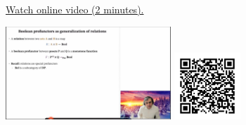 
\begin{minipage}{10cm}
    \href{https://act4e-spring21.netlify.app/videos/spring2021-profunctors:bool-prof-gen-rel.html}{Watch online video (2 minutes).}
        
    \href{https://act4e-spring21.netlify.app/videos/spring2021-profunctors:bool-prof-gen-rel.html}{\includegraphics[height=3.5cm]{spring2021-profunctors:bool-prof-gen-rel/thumbnails.jpg}}
    \href{https://act4e-spring21.netlify.app/videos/spring2021-profunctors:bool-prof-gen-rel.html}{\includegraphics[height=2.5cm]{spring2021-profunctors:bool-prof-gen-rel/qrcode.png}}
\end{minipage}
